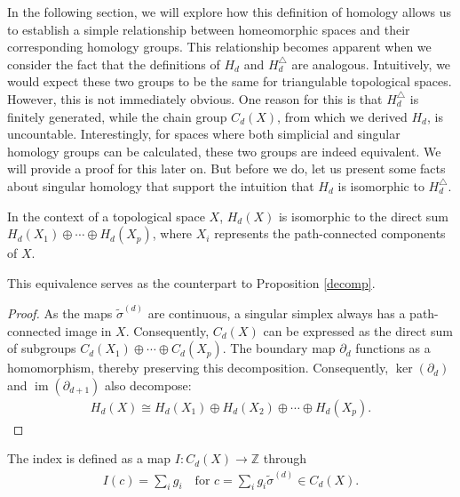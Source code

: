 In the following section, we will explore how this definition of homology allows us to establish a simple relationship between homeomorphic spaces and their corresponding homology groups. This relationship becomes apparent when we consider the fact that the definitions of \( H_{d} \) and \( H^{\triangle}_{d} \) are analogous. Intuitively, we would expect these two groups to be the same for triangulable topological spaces. However, this is not immediately obvious. One reason for this is that \( H^{\triangle}_{d} \) is finitely generated, while the chain group \( C_{d}(X) \), from which we derived \( H_{d} \), is uncountable. Interestingly, for spaces where both simplicial and singular homology groups can be calculated, these two groups are indeed equivalent. We will provide a proof for this later on. But before we do, let us present some facts about singular homology that support the intuition that \( H_{d} \) is isomorphic to \( H^{\triangle}_{d} \).

\begin{proposition}{\cite[Proposition 2.6]{hatcher2005algebraic}}
	In the context of a topological space \( X \), \( H_{d}(X) \) is isomorphic to the direct sum \( H_{d}(X_{1}) \oplus \cdots \oplus H_{d}(X_{p}) \), where \( X_{i} \) represents the path-connected components of \( X \).
\end{proposition}

This equivalence serves as the counterpart to Proposition \ref{decomp}.

\begin{proof}
	As the maps \( \tilde{\sigma}^{(d)} \) are continuous, a singular simplex always has a path-connected image in \( X \). Consequently, \( C_{d}(X) \) can be expressed as the direct sum of subgroups \( C_{d}(X_{1}) \oplus \cdots \oplus C_{d}(X_{p}) \). The boundary map \( \partial_d \) functions as a homomorphism, thereby preserving this decomposition. Consequently, \( \ker(\partial_{d}) \) and \( \operatorname{im}(\partial_{d+1}) \) also decompose:
	\begin{align}
		H_{d}(X) \cong H_{d}(X_{1}) \oplus H_{d}(X_{2}) \oplus \cdots \oplus H_{d}(X_{p}). 
	\end{align}
\end{proof}

\begin{definition}[Index]
	The index is defined as a map \( I: C_{d}(X) \to \mathbb{Z} \) through
	\begin{align}
		I(c) = \sum_{i} g_{i} \quad \text{for } c = \sum_{i} g_{i} \tilde{\sigma}^{(d)} \in C_{d}(X). 
	\end{align}
\end{definition}

